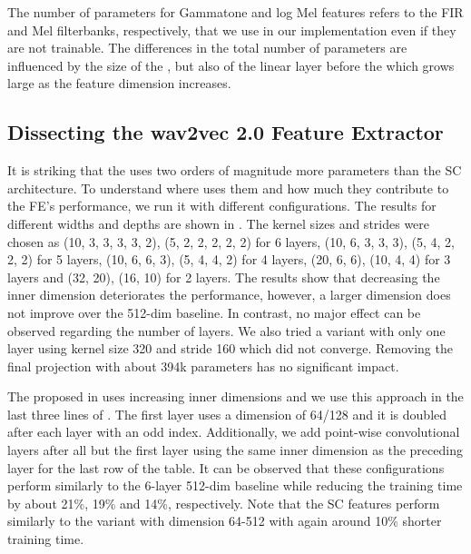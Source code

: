 \documentclass{INTERSPEECH2023}
\begin{document}
The number of parameters for Gammatone and log Mel features refers to the \gls{FIR} and Mel filterbanks, respectively, that we use in our implementation even if they are not trainable.
The differences in the total number of parameters are influenced by the size of the \fe, but also of the linear layer before the \conformer which grows large as the feature dimension increases.


\subsection{Dissecting the wav2vec 2.0 Feature Extractor}
\label{sec:w2v_components}
It is striking that the \wvtwo \fe uses two orders of magnitude more parameters than the \gls{SC} architecture.
To understand where \wvtwo uses them and how much they contribute to the \gls{FE}'s performance, we run it with different configurations.
The results for different widths and depths are shown in .
The kernel sizes and strides were chosen as (10, 3, 3, 3, 3, 2), (5, 2, 2, 2, 2, 2) for 6 layers, (10, 6, 3, 3, 3), (5, 4, 2, 2, 2) for 5 layers, (10, 6, 6, 3), (5, 4, 4, 2) for 4 layers, (20, 6, 6), (10, 4, 4) for 3 layers and (32, 20), (16, 10) for 2 layers.
The results show that decreasing the inner dimension deteriorates the performance, however, a larger dimension does not improve over the 512-dim baseline.
In contrast, no major effect can be observed regarding the number of layers.
We also tried a variant with only one layer using kernel size 320 and stride 160 which did not converge.
Removing the final projection with about 394k parameters has no significant impact.

%

The proposed \fe in \cite{asapp2022performance} uses increasing inner dimensions and we use this approach in the last three lines of .
The first layer uses a dimension of 64/128 and it is doubled after each layer with an odd index.
Additionally, we add point-wise convolutional layers after all but the first layer using the same inner dimension as the preceding layer for the last row of the table.
It can be observed that these configurations perform similarly to the 6-layer 512-dim baseline while reducing the training time by about 21\%, 19\% and 14\%, respectively.
Note that the \gls{SC} features perform similarly to the variant with dimension 64-512 with again around 10\% shorter training time.

\end{document}
